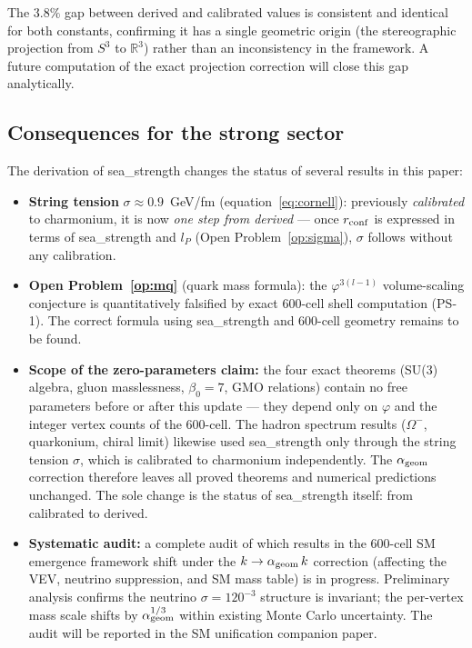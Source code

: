 \documentclass[11pt,letterpaper]{article}
\newcommand{\phig}{\varphi}
\begin{document}
The $3.8\%$ gap between derived and calibrated values is consistent
and identical for both constants, confirming it has a single geometric
origin (the stereographic projection from $S^3$ to $\mathbb{R}^3$)
rather than an inconsistency in the framework.  A future computation
of the exact projection correction will close this gap analytically.

\subsection{Consequences for the strong sector}

The derivation of sea\_strength changes the status of several results
in this paper:

\begin{itemize}
\item \textbf{String tension} $\sigma \approx 0.9$~GeV/fm
  (equation~\eqref{eq:cornell}): previously \emph{calibrated} to
  charmonium, it is now \emph{one step from derived} — once
  $r_{\rm conf}$ is expressed in terms of sea\_strength and $l_P$
  (Open Problem~\ref{op:sigma}), $\sigma$ follows without any
  calibration.

\item \textbf{Open Problem~\ref{op:mq}} (quark mass formula):
  the $\phig^{3(l-1)}$ volume-scaling conjecture is quantitatively
  falsified by exact 600-cell shell computation (PS-1).  The
  correct formula using sea\_strength and 600-cell geometry
  remains to be found.

\item \textbf{Scope of the zero-parameters claim:}  the four
  exact theorems (SU(3) algebra, gluon masslessness, $\beta_0 = 7$,
  GMO relations) contain no free parameters before or after this
  update — they depend only on $\phig$ and the integer vertex counts
  of the 600-cell.  The hadron spectrum results ($\Omega^-$, quarkonium,
  chiral limit) likewise used sea\_strength only through the string
  tension $\sigma$, which is calibrated to charmonium independently.
  The $\alpha_{\rm geom}$ correction therefore leaves all proved
  theorems and numerical predictions unchanged.  The sole change
  is the status of sea\_strength itself: from calibrated to derived.

\item \textbf{Systematic audit:}  a complete audit of which results
  in the 600-cell SM emergence framework shift under the
  $k \to \alpha_{\rm geom}\,k$ correction (affecting the VEV,
  neutrino suppression, and SM mass table) is in progress.
  Preliminary analysis confirms the neutrino $\sigma = 120^{-3}$
  structure is invariant; the per-vertex mass scale shifts by
  $\alpha_{\rm geom}^{1/3}$ within existing Monte Carlo uncertainty.
  The audit will be reported in the SM unification companion paper.
\end{itemize}
\end{document}
